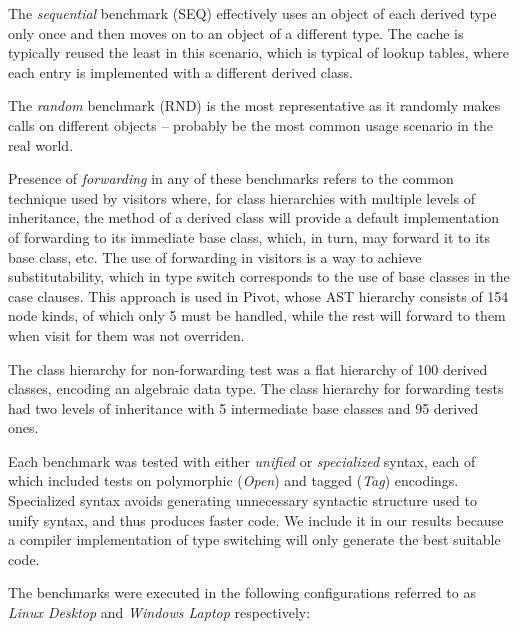 The \emph{sequential} benchmark (SEQ) effectively uses an object of each derived type only 
once and then moves on to an object of a different type. The cache is typically 
reused the least in this scenario, which is typical of lookup tables, where each 
entry is implemented with a different derived class.

The \emph{random} benchmark (RND) is the most representative as it randomly makes calls on 
different objects -- probably be the most common usage scenario in the real world.

Presence of \emph{forwarding} in any of these benchmarks refers to the 
common technique used by visitors where, for class hierarchies with multiple 
levels of inheritance, the  method of a derived class will provide a 
default implementation of forwarding to its immediate base class, which, in turn, 
may forward it to its base class, etc. The use of forwarding in visitors is a 
way to achieve substitutability, which in type switch corresponds to the use 
of base classes in the case clauses.
This approach is used in Pivot, whose AST 
hierarchy consists of 154 node kinds, of which only 5 must be handled, while the 
rest will forward to them when visit for them was not overriden.

The class hierarchy for non-forwarding test was a flat hierarchy of 100 
derived classes, encoding an algebraic data type. The class hierarchy for 
forwarding tests had two levels of inheritance with 5 intermediate base classes 
and 95 derived ones. 

Each benchmark was tested with either \emph{unified} or \emph{specialized} 
syntax, each of which included tests on polymorphic (\emph{Open}) and tagged 
(\emph{Tag}) encodings. Specialized syntax avoids generating unnecessary 
syntactic structure used to unify syntax, and thus produces faster code. We 
include it in our results because a compiler implementation of type switching 
will only generate the best suitable code.

The benchmarks were executed in the following configurations referred to as 
\emph{Linux Desktop} and \emph{Windows Laptop} respectively:

